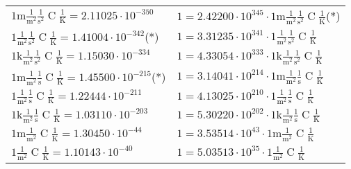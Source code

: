 \begin{center}
\begin{longtable}{l l}
{\color{gray}$1 \bm{\mathrm{ m}}\frac1{\operatorname{m}^2}\frac1{\operatorname{s}^2}{\operatorname{C}}\frac1{\operatorname{K}} = 2.11025\cdot10^{-350} $}   & {\color{gray}$ 1 = 2.42200\cdot10^{345} \cdot 1 \bm{\mathrm{ m}}\frac1{\operatorname{m}^2}\frac1{\operatorname{s}^2}{\operatorname{C}}\frac1{\operatorname{K}}$}\quad(*)\\
{\color{black}$1 \bm{\mathrm{ }}\frac1{\operatorname{m}^2}\frac1{\operatorname{s}^2}{\operatorname{C}}\frac1{\operatorname{K}} = 1.41004\cdot10^{-342} $}\quad(*) & {\color{black}$ 1 = 3.31235\cdot10^{341} \cdot 1 \bm{\mathrm{ }}\frac1{\operatorname{m}^2}\frac1{\operatorname{s}^2}{\operatorname{C}}\frac1{\operatorname{K}}$}  \\
{\color{gray}$1 \bm{\mathrm{ k}}\frac1{\operatorname{m}^2}\frac1{\operatorname{s}^2}{\operatorname{C}}\frac1{\operatorname{K}} = 1.15030\cdot10^{-334} $}   & {\color{gray}$ 1 = 4.33054\cdot10^{333} \cdot 1 \bm{\mathrm{ k}}\frac1{\operatorname{m}^2}\frac1{\operatorname{s}^2}{\operatorname{C}}\frac1{\operatorname{K}}$}  \\
{\color{gray}$1 \bm{\mathrm{ m}}\frac1{\operatorname{m}^2}\frac1{\operatorname{s}}{\operatorname{C}}\frac1{\operatorname{K}} = 1.45500\cdot10^{-215} $}\quad(*) & {\color{gray}$ 1 = 3.14041\cdot10^{214} \cdot 1 \bm{\mathrm{ m}}\frac1{\operatorname{m}^2}\frac1{\operatorname{s}}{\operatorname{C}}\frac1{\operatorname{K}}$}  \\
{\color{black}$1 \bm{\mathrm{ }}\frac1{\operatorname{m}^2}\frac1{\operatorname{s}}{\operatorname{C}}\frac1{\operatorname{K}} = 1.22444\cdot10^{-211} $}   & {\color{black}$ 1 = 4.13025\cdot10^{210} \cdot 1 \bm{\mathrm{ }}\frac1{\operatorname{m}^2}\frac1{\operatorname{s}}{\operatorname{C}}\frac1{\operatorname{K}}$}  \\
{\color{gray}$1 \bm{\mathrm{ k}}\frac1{\operatorname{m}^2}\frac1{\operatorname{s}}{\operatorname{C}}\frac1{\operatorname{K}} = 1.03110\cdot10^{-203} $}   & {\color{gray}$ 1 = 5.30220\cdot10^{202} \cdot 1 \bm{\mathrm{ k}}\frac1{\operatorname{m}^2}\frac1{\operatorname{s}}{\operatorname{C}}\frac1{\operatorname{K}}$}  \\
{\color{gray}$1 \bm{\mathrm{ m}}\frac1{\operatorname{m}^2}{}{\operatorname{C}}\frac1{\operatorname{K}} = 1.30450\cdot10^{-44} $}   & {\color{gray}$ 1 = 3.53514\cdot10^{43} \cdot 1 \bm{\mathrm{ m}}\frac1{\operatorname{m}^2}{}{\operatorname{C}}\frac1{\operatorname{K}}$}  \\
{\color{black}$1 \bm{\mathrm{ }}\frac1{\operatorname{m}^2}{}{\operatorname{C}}\frac1{\operatorname{K}} = 1.10143\cdot10^{-40} $}   & {\color{black}$ 1 = 5.03513\cdot10^{35} \cdot 1 \bm{\mathrm{ }}\frac1{\operatorname{m}^2}{}{\operatorname{C}}\frac1{\operatorname{K}}$}  \\

\end{longtable}
\end{center}
